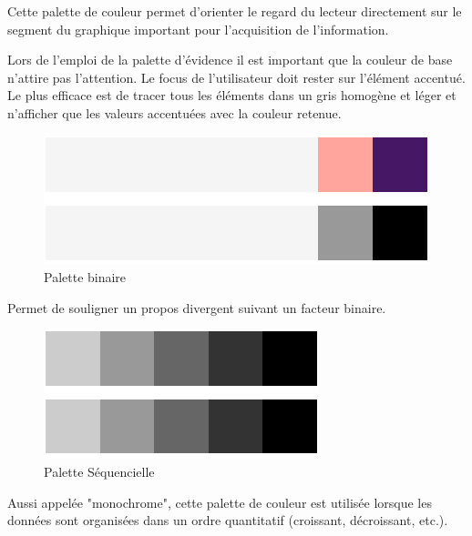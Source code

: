 \documentclass[a4paper,12pt]{article}
\begin{document}
\begin{multicols}{2}
Cette palette de couleur permet d'orienter le regard du lecteur directement sur le segment du graphique important pour l'acquisition de l'information.\autocite{andreaskrauseBestPracticesData2024}

Lors de l'emploi de la palette d'évidence il est important que la couleur de base n'attire pas l'attention. Le focus de l'utilisateur doit rester sur l'élément accentué.\autocite{wilkeColorScales2019}
Le plus efficace est de tracer tous les éléments dans un gris homogène et léger et n'afficher que les valeurs accentuées avec la couleur retenue. \autocite{wilkeColorScales2019}

\begin{figure}[H]
\centering
\includegraphics[width=.9\linewidth]{./img/palette-binaire.pdf}
\caption{\label{fig:org3f07aa4}Palette binaire}
\end{figure}

Permet de souligner un propos divergent suivant un facteur binaire.\autocite{jonathanschwabishDevelopingDataVisualization2021} 


\begin{figure}[H]
\centering
\includegraphics[width=.9\linewidth]{./img/palette-monochrome.pdf}
\caption{\label{fig:org0f16400}Palette Séquencielle}
\end{figure}

Aussi appelée "monochrome", cette palette de couleur est utilisée lorsque les données sont organisées dans un ordre quantitatif (croissant, décroissant, etc.). \autocite{wilkeColorScales2019,jonathanschwabishDevelopingDataVisualization2021}


\end{multicols}
\end{document}

